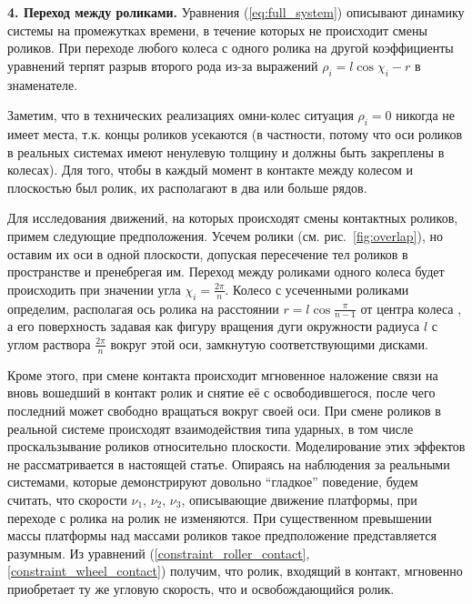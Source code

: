 {\bf 4. Переход между роликами.}
Уравнения (\ref{eq:full_system}) описывают динамику системы на промежутках времени, в течение которых не происходит смены роликов. 
При переходе любого колеса с одного ролика на другой коэффициенты уравнений терпят разрыв второго рода из-за выражений $\rho_i = l\cos\chi_i-r$ в знаменателе.


Заметим, что в технических реализациях омни-колес ситуация $\rho_i = 0$ никогда не имеет места, т.к. концы роликов усекаются (в частности, потому что оси роликов в реальных системах имеют ненулевую толщину и должны быть закреплены в колесах). Для того, чтобы в каждый момент в контакте между колесом и плоскостью был ролик, их располагают в два или больше рядов. %

Для исследования движений, на которых происходят смены контактных роликов, примем следующие предположения. Усечем ролики (см. рис.~\ref{fig:overlap}), но оставим их оси в одной плоскости, допуская пересечение тел роликов в пространстве и пренебрегая им. Переход между роликами одного колеса будет происходить при значении угла $\chi_i = \frac{2\pi}{n}$. Колесо с усеченными роликами определим, располагая ось ролика на расстоянии $r = l\cos\frac{\pi}{n-1}$ от центра колеса
, а его поверхность задавая как фигуру вращения дуги окружности радиуса $l$ с углом раствора $\frac{2\pi}{n}$ вокруг этой оси, замкнутую соответствующими дисками.

Кроме этого, при смене контакта происходит мгновенное наложение связи на вновь вошедший в контакт ролик и снятие её с освободившегося, после чего последний может свободно вращаться вокруг своей оси. При смене роликов в реальной системе происходят взаимодействия типа ударных, в том числе проскальзывание роликов относительно плоскости. Моделирование этих эффектов не рассматривается в настоящей статье. Опираясь на наблюдения за реальными системами, которые демонстрируют довольно ``гладкое'' поведение, будем считать, что скорости $\nu_1$, $\nu_2$, $\nu_3$, описывающие движение платформы, при переходе с ролика на ролик не изменяются. При существенном превышении массы платформы над массами роликов такое предположение представляется разумным. Из уравнений (\ref{constraint_roller_contact}, \ref{constraint_wheel_contact}) получим, что ролик, входящий в контакт, мгновенно приобретает ту же угловую скорость, что и освобождающийся ролик.

